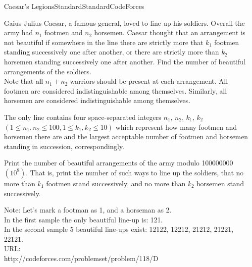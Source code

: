 \begin{problema}{Caesar's Legions}{Standard}{Standard}{CodeForces}


Gaius Julius Caesar, a famous general, loved to line up his soldiers. Overall the army had $n_1$ footmen and $n_2$ horsemen. Caesar thought that an arrangement is not beautiful if somewhere in the line there are strictly more that $k_1$ footmen standing successively one after another, or there are strictly more than $k_2$ horsemen standing successively one after another. Find the number of beautiful arrangements of the soldiers. \\

Note that all $n_1 + n_2$ warriors should be present at each arrangement. All footmen are considered indistinguishable among themselves. Similarly, all horsemen are considered indistinguishable among themselves. \\


\InputFile

The only line contains four space-separated integers $n_1$, $n_2$, $k_1$, $k_2$ $(1 \leq n_1, n_2 \leq 100, 1 \leq k_1, k_2 \leq 10)$ which represent how many footmen and horsemen there are and the largest acceptable number of footmen and horsemen standing in succession, correspondingly.  \\ 


\OutputFile

Print the number of beautiful arrangements of the army modulo 100000000 $(10^8)$. That is, print the number of such ways to line up the soldiers, that no more than $k_1$ footmen stand successively, and no more than $k_2$ horsemen stand successively. \\



\Example



Note: Let's mark a footman as 1, and a horseman as 2. \\

In the first sample the only beautiful line-up is: 121. \\

In the second sample 5 beautiful line-ups exist: 12122, 12212, 21212, 21221, 22121.\\

URL:\\ 
http://codeforces.com/problemset/problem/118/D


\end{problema}
